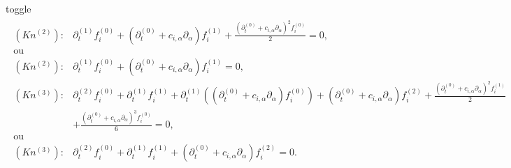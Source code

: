 \documentclass[letterpaper,10pt,english,openany,oneside]{jupyterBook}
\begin{document}
\begin{sphinxuseclass}{toggle}
\begin{equation}
\begin{split}
\begin{array}{ll}
    (Kn^{(2)}):& \partial_{t}^{(1)} f_{i}^{(0)} + \left( \partial_{t}^{(0)} + c_{i,\alpha}\partial_{\alpha} \right)f_{i}^{(1)} + \displaystyle\frac{\left( \partial_{t}^{(0)} + c_{i,\alpha}\partial_{\alpha} \right)^{2} f_{i}^{(0)}}{2}= 0,\\
    \textrm{ou} &\\
    (Kn^{(2)}):& \partial_{t}^{(1)} f_{i}^{(0)} + \left( \partial_{t}^{(0)} + c_{i,\alpha}\partial_{\alpha} \right)f_{i}^{(1)} = 0,\\
    (Kn^{(3)}):& \partial_{t}^{(2)} f_{i}^{(0)} +\partial_{t}^{(1)} f_{i}^{(1)} + \partial_{t}^{(1)}\left( \left( \partial_{t}^{(0)} + c_{i,\alpha}\partial_{\alpha} \right)f_{i}^{(0)} \right) + \left( \partial_{t}^{(0)} + c_{i,\alpha}\partial_{\alpha} \right)f_{i}^{(2)} + \displaystyle\frac{\left( \partial_{t}^{(0)} + c_{i,\alpha}\partial_{\alpha} \right)^{2} f_{i}^{(1)}}{2} \\ 
    & +  \displaystyle\frac{\left( \partial_{t}^{(0)} + c_{i,\alpha}\partial_{\alpha} \right)^{3} f_{i}^{(0)}}{6} =  0,  \\
    \textrm{ou} &\\
    (Kn^{(3)}):& \partial_{t}^{(2)} f_{i}^{(0)} +\partial_{t}^{(1)} f_{i}^{(1)} + \left( \partial_{t}^{(0)} + c_{i,\alpha}\partial_{\alpha} \right)f_{i}^{(2)} =  0.  \\
 \end{array}
\end{split}
\end{equation}
\sphinxAtStartPar
{}


\end{sphinxuseclass}
\end{document}
